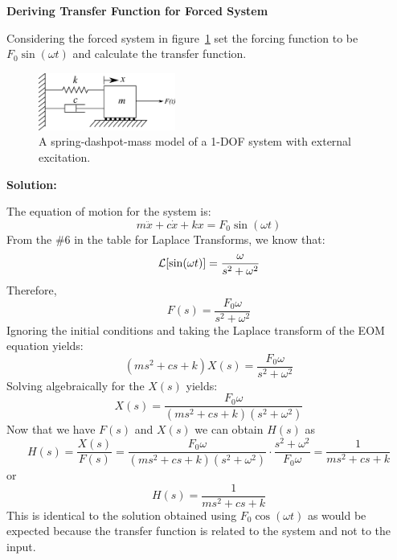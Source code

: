 \documentclass[12pt,letter]{article}
\begin{document}
\begin{example}


	\noindent\textbf{Deriving Transfer Function for Forced System}

	\noindent Considering the forced system in figure~\ref{fig:1-DOF-spring_dashpot_mass_horizontal_forced}	set the forcing function to be $F_0 \sin(\omega t)$ and calculate the transfer function.  \\
	\begin{figure}[H]
		\centering
		\includegraphics[width=0.4\textwidth]{../figures/1-DOF-spring_dashpot_mass_horizontal_forced.png}
		\caption{A spring-dashpot-mass model of a 1-DOF system with external excitation.}
		\label{fig:1-DOF-spring_dashpot_mass_horizontal_forced}
	\end{figure}

	
	\noindent\textbf{Solution:}

	\noindent The equation of motion for the system is:
	\begin{equation}
		m\ddot{x} + c\dot{x} +kx = F_0 \sin(\omega t)
	\end{equation}
	From the \#6 in the table for Laplace Transforms, we know that:
	\begin{equation}
		\mathcal{L}{\left[\sin(\omega t)\right]} = \frac{\omega}{s^2+\omega^2}
	\end{equation}
	Therefore, 
	\begin{equation}
	F(s) = \frac{F_0\omega}{s^2+\omega^2}
	\end{equation}
	Ignoring the initial conditions and taking the Laplace transform of the EOM equation yields:
	\begin{equation}
	(ms^2 + cs +k)X(s) = \frac{F_0 \omega}{s^2+\omega^2} 
	\end{equation}
	Solving algebraically for the $X(s)$ yields: 
	\begin{equation}
	X(s) = \frac{F_0\omega}{(ms^2 + cs +k)(s^2+\omega^2)}
	\end{equation}
	Now that we have $F(s)$ and $X(s)$ we can obtain $H(s)$ as  
	\begin{equation}
	H(s) = \frac{X(s)}{F(s)} = \frac{F_0 \omega }{(ms^2 + cs +k)(s^2+\omega^2)} \cdot \frac{s^2+\omega^2}{F_0 \omega} = \frac{1}{ms^2+cs+k}
	\end{equation}
	or 
	\begin{equation}
	H(s) = \frac{1}{ms^2+cs+k}
	\end{equation}
	This is identical to the solution obtained using $F_0 \cos(\omega t)$ as would be expected because the transfer function is related to the system and not to the input. 
\end{example}  
\end{document}
